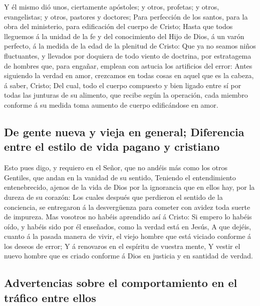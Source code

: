  Y él mismo dió unos, ciertamente apóstoles; y otros,
profetas; y otros, evangelistas; y otros, pastores y doctores;
 Para perfección de los santos, para la obra del
ministerio, para edificación del cuerpo de Cristo;  Hasta
que todos lleguemos á la unidad de la fe y del conocimiento del Hijo de
Dios, á un varón perfecto, á la medida de la edad de la plenitud de
Cristo:  Que ya no seamos niños fluctuantes, y llevados
por doquiera de todo viento de doctrina, por estratagema de hombres que,
para engañar, emplean con astucia los artificios del error:
 Antes siguiendo la verdad en amor, crezcamos en todas
cosas en aquel que es la cabeza, á saber, Cristo;  Del
cual, todo el cuerpo compuesto y bien ligado entre sí por todas las
junturas de su alimento, que recibe según la operación, cada miembro
conforme á su medida toma aumento de cuerpo edificándose en amor.

\hypertarget{de-gente-nueva-y-vieja-en-general-diferencia-entre-el-estilo-de-vida-pagano-y-cristiano}{%
\subsection{De gente nueva y vieja en general; Diferencia entre el
estilo de vida pagano y
cristiano}\label{de-gente-nueva-y-vieja-en-general-diferencia-entre-el-estilo-de-vida-pagano-y-cristiano}}

 Esto pues digo, y requiero en el Señor, que no andéis
más como los otros Gentiles, que andan en la vanidad de su sentido,
 Teniendo el entendimiento entenebrecido, ajenos de la
vida de Dios por la ignorancia que en ellos hay, por la dureza de su
corazón:  Los cuales después que perdieron el sentido de
la conciencia, se entregaron á la desvergüenza para cometer con avidez
toda suerte de impureza.  Mas vosotros no habéis
aprendido así á Cristo:  Si empero lo habéis oído, y
habéis sido por él enseñados, como la verdad está en Jesús,
 A que dejéis, cuanto á la pasada manera de vivir, el
viejo hombre que está viciado conforme á los deseos de error;
 Y á renovaros en el espíritu de vuestra mente,
 Y vestir el nuevo hombre que es criado conforme á Dios
en justicia y en santidad de verdad.

\hypertarget{advertencias-sobre-el-comportamiento-en-el-truxe1fico-entre-ellos}{%
\subsection{Advertencias sobre el comportamiento en el tráfico entre
ellos}\label{advertencias-sobre-el-comportamiento-en-el-truxe1fico-entre-ellos}}

